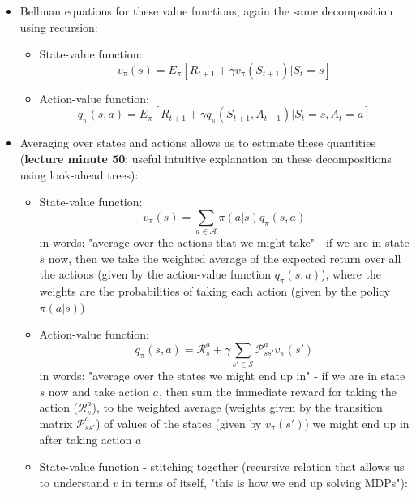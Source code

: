 \documentclass{article}
\begin{document}
\begin{itemize}
\begin{itemize}
    \end{itemize}
    \item Bellman equations for these value functions, again the same decomposition using recursion:
    \begin{itemize}
        \item State-value function: 
        \begin{equation}
            v_\pi(s)=E_\pi[R_{t+1}+\gamma v_\pi(S_{t+1})|S_t=s]
        \end{equation}
        \item Action-value function: 
        \begin{equation}
            q_\pi(s, a)=E_\pi[R_{t+1}+\gamma q_\pi(S_{t+1}, A_{t+1})|S_t=s, A_t=a]
        \end{equation}
    \end{itemize}
    \item Averaging over states and actions allows us to estimate these quantities (\textbf{lecture minute 50}: useful intuitive explanation on these decompositions using look-ahead trees):
    \begin{itemize}
        \item State-value function:
        \begin{equation}
            v_\pi(s)=\sum_{a\in \mathcal{A}}\pi(a|s)q_\pi(s, a)
        \end{equation}
        in words: "average over the actions that we might take" - if we are in state $s$ now, then we take the weighted average of the expected return over all the actions (given by the action-value function $q_\pi(s,a)$), where the weights are the probabilities of taking each action (given by the policy $\pi(a|s)$)
        \item Action-value function:
        \begin{equation}
            q_\pi(s, a)=\mathcal{R}^a_s+\gamma \sum_{s'\in \mathcal{S}}\mathcal{P}^a_{ss'}v_\pi(s')
        \end{equation}
        in words: "average over the states we might end up in" - if we are in state $s$ now and take action $a$, then sum the immediate reward for taking the action ($\mathcal{R}^a_s$), to the weighted average (weights given by the transition matrix $\mathcal{P}^a_{ss'}$) of values of the states (given by $v_\pi(s')$) we might end up in after taking action $a$
        \item State-value function - stitching together (recursive relation that allows us to understand $v$ in terms of itself, "this is how we end up solving MDPs"): 

\end{itemize}
\end{itemize}
\end{document}
